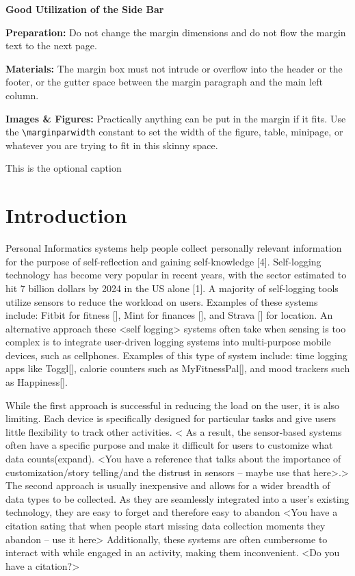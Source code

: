 \documentclass[sigchi-a, authorversion]{acmart}
\begin{document}
\begin{sidebar}
  \textbf{Good Utilization of the Side Bar}

  \textbf{Preparation:} Do not change the margin
  dimensions and do not flow the margin text to the
  next page.

  \textbf{Materials:} The margin box must not intrude
  or overflow into the header or the footer, or the gutter space
  between the margin paragraph and the main left column.

  \textbf{Images \& Figures:} Practically anything
  can be put in the margin if it fits. Use the
  \texttt{{\textbackslash}marginparwidth} constant to set the
  width of the figure, table, minipage, or whatever you are trying
  to fit in this skinny space.

  \caption{This is the optional caption}
  \label{bar:sidebar}
\end{sidebar}

\section{Introduction}
Personal Informatics systems help people collect personally relevant information for the purpose of self-reflection and gaining self-knowledge [4]. Self-logging technology has become very popular in recent years, with the sector estimated to hit 7 billion dollars by 2024 in the US alone [1]. A majority of self-logging tools utilize sensors to reduce the workload on users. Examples of these systems include: Fitbit for fitness [], Mint for finances [], and Strava [] for location. An alternative approach these <self logging> systems often take when sensing is too complex is to integrate user-driven logging systems into multi-purpose mobile devices, such as cellphones. Examples of this type of system include: time logging apps like Toggl[], calorie counters such as MyFitnessPal[], and mood trackers such as Happiness[].

While the first approach is successful in reducing the load on the user, it is also limiting. Each device is specifically designed for particular tasks and give users little flexibility to track other activities. < As a result, the sensor-based systems often have a specific purpose and make it difficult for users to customize what data counts(expand). <You have a reference that talks about the importance of customization/story telling/and the distrust in sensors – maybe use that here>.> The second approach is usually inexpensive and allows for a wider breadth of data types to be collected. As they are seamlessly integrated into a user’s existing technology, they are easy to forget and therefore easy to abandon <You have a citation sating that when people start missing data collection moments they abandon – use it here> Additionally, these systems are often cumbersome to interact with while engaged in an activity, making them inconvenient. <Do you have a citation?>
\end{document}
